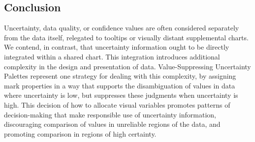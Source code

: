 \subsection{Conclusion}

Uncertainty, data quality, or confidence values are often considered separately from the data itself, relegated to tooltips or visually distant supplemental charts. We contend, in contrast, that uncertainty information ought to be directly integrated within a shared chart. This integration introduces additional complexity in the design and presentation of data. Value-Suppressing Uncertainty Palettes represent one strategy for dealing with this complexity, by assigning mark properties in a way that supports the disambiguation of values in data where uncertainty is low, but suppresses these judgments when uncertainty is high. This decision of how to allocate visual variables promotes patterns of decision-making that make responsible use of uncertainty information, discouraging comparison of values in unreliable regions of the data, and promoting comparison in regions of high certainty.
